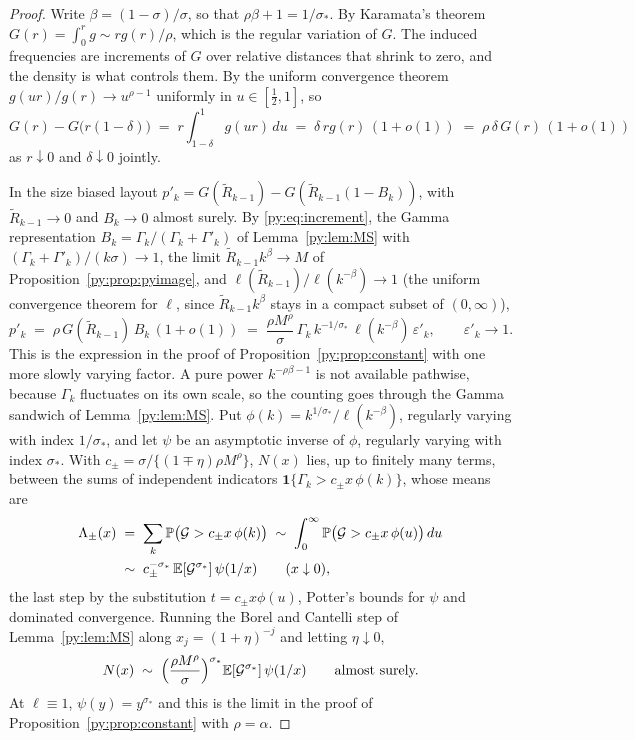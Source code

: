 \begin{proof}
Write $\beta = (1-\sigma)/\sigma$, so that $\rho\beta + 1 = 1/\sigma_*$. By Karamata's theorem $G(r) = \int_0^r g \sim rg(r)/\rho$, which is the regular variation of $G$. The induced frequencies are increments of $G$ over relative distances that shrink to zero, and the density is what controls them. By the uniform convergence theorem $g(ur)/g(r) \to u^{\rho-1}$ uniformly in $u \in [\tfrac12,1]$, so
\begin{equation}
G(r) - G\big(r(1-\delta)\big) \;=\; r\int_{1-\delta}^{1} g(ur)\,du
\;=\; \delta\, rg(r)\,(1+o(1)) \;=\; \rho\,\delta\, G(r)\,(1+o(1))
\label{py:eq:increment}
\end{equation}
as $r \downarrow 0$ and $\delta \downarrow 0$ jointly.

In the size biased layout $p'_k = G(\widetilde R_{k-1}) - G(\widetilde R_{k-1}(1-B_k))$, with $\widetilde R_{k-1} \to 0$ and $B_k \to 0$ almost surely. By \eqref{py:eq:increment}, the Gamma representation $B_k = \Gamma_k/(\Gamma_k+\Gamma'_k)$ of Lemma~\ref{py:lem:MS} with $(\Gamma_k+\Gamma'_k)/(k\sigma) \to 1$, the limit $\widetilde R_{k-1}k^{\beta} \to M$ of Proposition~\ref{py:prop:pyimage}, and $\ell(\widetilde R_{k-1})/\ell(k^{-\beta}) \to 1$ (the uniform convergence theorem for $\ell$, since $\widetilde R_{k-1}k^{\beta}$ stays in a compact subset of $(0,\infty)$),
\[
p'_k \;=\; \rho\, G(\widetilde R_{k-1})\,B_k\,(1+o(1))
\;=\; \frac{\rho M^{\rho}}{\sigma}\,\Gamma_k\,k^{-1/\sigma_*}\,\ell(k^{-\beta})\,\varepsilon'_k,
\qquad \varepsilon'_k \to 1 .
\]
This is the expression in the proof of Proposition~\ref{py:prop:constant} with one more slowly varying factor. A pure power $k^{-\rho\beta-1}$ is not available pathwise, because $\Gamma_k$ fluctuates on its own scale, so the counting goes through the Gamma sandwich of Lemma~\ref{py:lem:MS}. Put $\phi(k) = k^{1/\sigma_*}/\ell(k^{-\beta})$, regularly varying with index $1/\sigma_*$, and let $\psi$ be an asymptotic inverse of $\phi$, regularly varying with index $\sigma_*$. With $c_\pm = \sigma/\{(1\mp\eta)\rho M^{\rho}\}$, $N(x)$ lies, up to finitely many terms, between the sums of independent indicators $\mathbf{1}\{\Gamma_k > c_\pm x\,\phi(k)\}$, whose means are
\[
\begin{aligned}
\Lambda_\pm(x) \;&=\; \sum_k \mathbb{P}\big(\mathcal{G} > c_\pm x\,\phi(k)\big)
\;\sim\; \int_0^\infty \mathbb{P}\big(\mathcal{G} > c_\pm x\,\phi(u)\big)\,du\\
&\sim\; c_\pm^{-\sigma_*}\,\mathbb{E}[\mathcal{G}^{\sigma_*}]\,\psi(1/x)
\qquad (x \downarrow 0),
\end{aligned}
\]
the last step by the substitution $t = c_\pm x\phi(u)$, Potter's bounds for $\psi$ and dominated convergence. Running the Borel and Cantelli step of Lemma~\ref{py:lem:MS} along $x_j = (1+\eta)^{-j}$ and letting $\eta \downarrow 0$,
\[
N(x) \;\sim\; \Big(\frac{\rho M^{\rho}}{\sigma}\Big)^{\sigma_*}\mathbb{E}[\mathcal{G}^{\sigma_*}]\,\psi(1/x)
\qquad\text{almost surely.}
\]
At $\ell \equiv 1$, $\psi(y) = y^{\sigma_*}$ and this is the limit in the proof of Proposition~\ref{py:prop:constant} with $\rho = \alpha$.


\end{proof}
